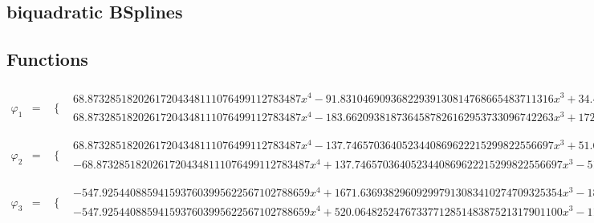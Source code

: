 \documentclass{article}
\begin{document}
 

\begin{landscape}
\section{biquadratic BSplines}
\subsection{Functions}\begin{eqnarray*} \varphi_1 & = & \begin{array}{cc}
 \{ & 
\begin{array}{cc}
 68.87328518202617204348111076499112783487 x^4-91.83104690936822939130814768665483711316 x^3+34.43664259101308602174055538249556391743 x^2 & x\geq 0\land x<\frac{1}{2} \\
 68.87328518202617204348111076499112783487 x^4-183.6620938187364587826162953733096742263 x^3+172.1832129550654301087027769124778195872 x^2-68.87328518202617204348111076499112783487 x+11.47888086367102867391351846083185463914 & x\geq \frac{1}{2}\land x<1
\end{array}

\end{array}\\
\varphi_2 & = & \begin{array}{cc}
 \{ & 
\begin{array}{cc}
 68.87328518202617204348111076499112783487 x^4-137.7465703640523440869622215299822556697 x^3+51.65496388651962903261083307374334587615 x^2 & x\geq 0\land x<\frac{1}{2} \\
 -68.87328518202617204348111076499112783487 x^4+137.7465703640523440869622215299822556697 x^3-51.65496388651962903261083307374334587615 x^2-34.43664259101308602174055538249556391743 x+17.21832129550654301087027769124778195872 & x\geq \frac{1}{2}\land x<1
\end{array}

\end{array}\\
\varphi_3 & = & \begin{array}{cc}
 \{ & 
\begin{array}{cc}
 -547.9254408859415937603995622567102788659 x^4+1671.636938296092997913083410274709325354 x^3-1843.444068065413667143039205219610006015 x^2+863.6790847863147155884264286419331514327 x-143.9465141310524525980710714403221919055 & x\geq \frac{1}{2}\land x<1 \\
 -547.9254408859415937603995622567102788659 x^4+520.0648252476733771285148387521317901100 x^3-116.0858984927842359661863479357437031496 x^2 & x\geq 0\land x<\frac{1}{2}
\end{array}


\end{array}
\end{eqnarray*}
\end{landscape}
\end{document}
